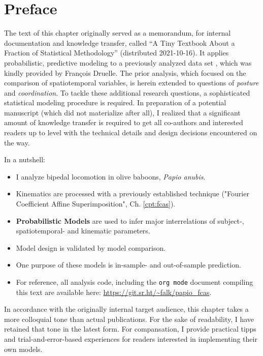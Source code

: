 
\clearpage

\section{Preface}
\label{sec:orgcfa10a1}
The text of this chapter originally served as a memorandum, for internal documentation and knowledge transfer, called ``A Tiny Textbook About a Fraction of Statistical Methodology'' (distributed 2021-10-16).
It applies probabilistic, predictive modeling to a previously analyzed data set \citep[][]{Druelle2021}, which was kindly provided by François Druelle.
The prior analysis, which focused on the comparison of spatiotemporal variables, is herein extended to questions of \emph{posture} and \emph{coordination}.
To tackle these additional research questions, a sophisticated statistical modeling procedure is required.
In preparation of a potential manuscript (which did not materialize after all), I realized that a significant amount of knowledge transfer is required to get all co-authors and interested readers up to level with the technical details and design decisions encountered on the way.


In a nutshell:
\begin{itemize}
\item I analyze bipedal locomotion in olive baboons, \emph{Papio anubis}.
\item Kinematics are processed with a previously established technique ("Fourier Coefficient Affine Superimposition", Ch. \ref{cpt:fcas}).
\item \textbf{Probabilistic Models} are used to infer major interrelations of subject-, spatiotemporal- and kinematic parameters.
\item Model design is validated by model comparison.
\item One purpose of these models is in-sample- and out-of-sample prediction.
\item For reference, all analysis code, including the \texttt{org mode} document compiling this text are available here: \url{https://git.sr.ht/\~falk/papio\_fcas}.
\end{itemize}

In accordance with the originally internal target audience, this chapter takes a more colloquial tone than actual publications.
For the sake of readability, I have retained that tone in the latest form.
For compansation, I provide practical tipps and trial-and-error-based experiences for readers interested in implementing their own models.

